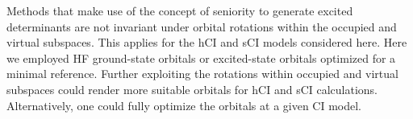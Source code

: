 \documentclass[aip,jcp,reprint,noshowkeys,superscriptaddress]{revtex4-1}
\newcommand{\SupInf}{\textcolor{blue}{Supporting Information}}
\newcommand{\mc}{\multicolumn}
\begin{document}
Methods that make use of the concept of seniority to generate excited determinants 
are not invariant under orbital rotations within the occupied and virtual subspaces. \cite{Bytautas_2011,Limacher_2014,Stein_2014}
This applies for the hCI and sCI models considered here.
Here we employed HF ground-state orbitals or excited-state orbitals optimized for a minimal reference. \cite{Kossoski_2023}
Further exploiting the rotations within occupied and virtual subspaces could render more suitable orbitals for hCI and sCI calculations.
Alternatively, one could fully optimize the orbitals at a given CI model.

\end{document}
